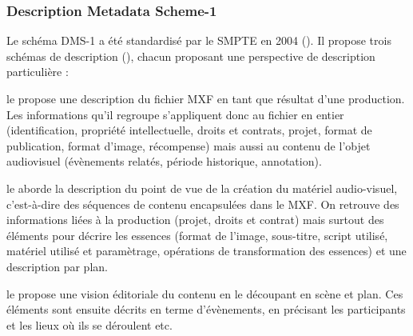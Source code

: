 \subsubsection{Description Metadata Scheme-1}\label{sec:dms-1}
Le schéma DMS-1 a été standardisé par le SMPTE en 2004 (\cite{Smpte2004}).
Il propose trois schémas de description (), chacun proposant une perspective de description particulière : 
\begin{liste}
	\item le  propose une description du fichier MXF en tant que résultat d'une production. 
	Les informations qu'il regroupe s'appliquent donc au fichier en entier (identification, propriété intellectuelle, droits et contrats, projet, format de publication, format d'image, récompense) mais aussi au contenu de l'objet audiovisuel (évènements relatés, période historique, annotation).

	\item le  aborde la description du point de vue de la création du matériel audio-visuel, c'est-à-dire des séquences de contenu encapsulées dans le MXF. 
	On retrouve des informations liées à la production (projet, droits et contrat) mais surtout des éléments pour décrire les essences (format de l'image, sous-titre, script utilisé, matériel utilisé et paramètrage, opérations de transformation des essences) et une description par plan.

	\item le  propose une vision éditoriale du contenu en le découpant en scène et plan. 
	Ces éléments sont ensuite décrits en terme d'évènements, en précisant les participants et les lieux où ils se déroulent etc.
\end{liste}

